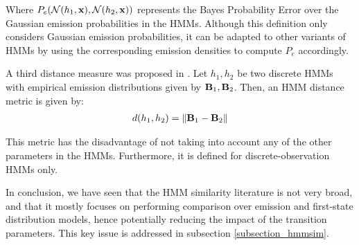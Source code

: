 \documentclass[../main.tex]{subfiles}
\begin{document}
\par Where $P_e{(\mathcal{N}(h_1, \mathbf{x}), \mathcal{N}(h_2, \mathbf{x}))}$ represents the Bayes Probability Error over the Gaussian emission probabilities in the HMMs. Although this definition only considers Gaussian emission probabilities, it can be adapted to other variants of HMMs by using the corresponding emission densities to compute $P_e$ accordingly.
\par A third distance measure was proposed in \cite{Juang1985}. Let $h_1, h_2$ be two discrete HMMs with empirical emission distributions given by $\mathbf{B}_1, \mathbf{B}_2$. Then, an HMM distance metric is given by:
\begin{align*}
d(h_1, h_2) = \left\lVert\mathbf{B}_1 - \mathbf{B}_2\right\rVert
\end{align*}
\par This metric has the disadvantage of not taking into account any of the other parameters in the HMMs. Furthermore, it is defined for discrete-observation HMMs only.
\par In conclusion, we have seen that the HMM similarity literature is not very broad, and that it mostly focuses on performing comparison over emission and first-state distribution models, hence potentially reducing the impact of the transition parameters. This key issue is addressed in subsection \ref{subsection_hmmsim}.
\end{document}
